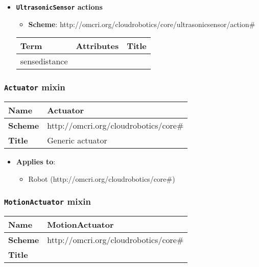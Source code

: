 \begin{itemize}
\item \textbf{\texttt{UltrasonicSensor} actions}

\begin{itemize}
	\item \textbf{Scheme}: http://omcri.org/cloudrobotics/core/ultrasonicsensor/action\#
\end{itemize}

\begin{center}
\begin{tabular}{|l|l|l|}
  \hline
  \textbf{Term}  & \textbf{Attributes} & \textbf{Title} \\
  \hline  
  sensedistance & &  \\
  \hline
\end{tabular}
\end{center}
\end{itemize}

 
\subsubsection{\texttt{Actuator} mixin}
\begin{center}
\begin{tabular}{|l|l|}
  \hline
  \textbf{Name} & Actuator \\
  \hline  
  \textbf{Scheme} & http://omcri.org/cloudrobotics/core\# \\
  \hline
  \textbf{Title} & Generic actuator \\
  \hline
\end{tabular}
\end{center}
\begin{itemize}
\item \textbf{Applies to}:
\begin{itemize}
	\item Robot (http://omcri.org/cloudrobotics/core\#)
\end{itemize}
\end{itemize} 



 
\subsubsection{\texttt{MotionActuator} mixin}
\begin{center}
\begin{tabular}{|l|l|}
  \hline
  \textbf{Name} & MotionActuator \\
  \hline  
  \textbf{Scheme} & http://omcri.org/cloudrobotics/core\# \\
  \hline
  \textbf{Title} &  \\
  \hline
\end{tabular}
\end{center}

